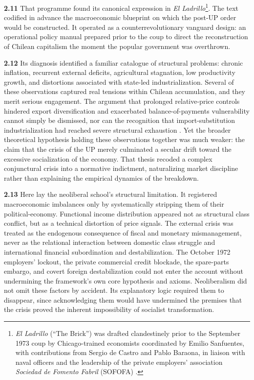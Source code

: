 \textbf{2.11} That programme found its canonical expression in \textit{El Ladrillo}\footnote{\textit{El Ladrillo} (``The Brick'') was drafted clandestinely prior to the September 1973 coup by Chicago-trained 
economists coordinated by Emilio Sanfuentes, with contributions from Sergio de Castro and Pablo Baraona, 
in liaison with naval officers and the leadership of the private employers' association \textit{Sociedad de Fomento Fabril} (SOFOFA)  \citep{DeCastro1992}.}. The text codified in advance the macroeconomic blueprint on which the post-UP order would be constructed. It operated as a counterrevolutionary vanguard design: an 
operational policy manual prepared prior to the coup to direct the reconstruction of Chilean capitalism 
the moment the popular government was overthrown.

\textbf{2.12} Its diagnosis identified a familiar catalogue of structural problems: chronic inflation, 
recurrent external deficits, agricultural stagnation, low productivity growth, and distortions 
associated with state-led industrialization. Several of these observations captured real tensions within 
Chilean accumulation, and they merit serious engagement. The argument that prolonged relative-price 
controls hindered export diversification and exacerbated balance-of-payments vulnerability cannot 
simply be dismissed, nor can the recognition that import-substitution industrialization had reached severe 
structural exhaustion \citep{DeCastro1992}. Yet the broader theoretical hypothesis holding these observations 
together was much weaker: the claim that the crisis of the UP merely culminated a secular drift toward the 
excessive socialization of the economy. That thesis recoded a complex conjunctural crisis into a normative 
indictment, naturalizing market discipline rather than explaining the empirical dynamics of the breakdown.

\textbf{2.13} Here lay the neoliberal school's structural limitation. It registered macroeconomic imbalances 
only by systematically stripping them of their political-economy. Functional income distribution 
appeared not as structural class conflict, but as a technical distortion of price signals. The external 
crisis was treated as the endogenous consequence of fiscal and monetary mismanagement, never as the relational 
interaction between domestic class struggle and international financial subordination and destabilization. The October 1972  employers' lockout, the private commercial credit blockade, the spare-parts embargo, and covert foreign destabilization could not enter the account without undermining the framework's own core hypothesis and axioms. Neoliberalism did not omit these factors by accident. Its explanatory logic required them to disappear, since acknowledging them would have undermined the premises that the crisis proved the inherent impossibility of socialist transformation.


